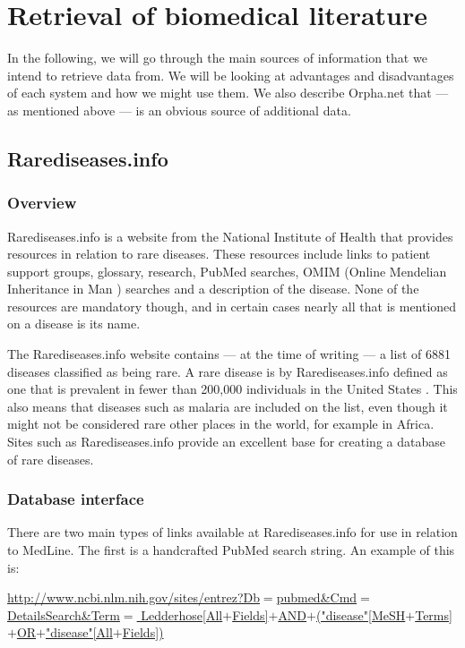 \section{Retrieval of biomedical literature}

In the following, we will go through the main sources of information
that we intend to retrieve data from. We will be looking at advantages
and disadvantages of each system and how we might use them. We also
describe Orpha.net that --- as mentioned above --- is an obvious source of
additional data.

\subsection{Rarediseases.info\label{Rarediseases_info}}

\subsubsection{Overview}
Rarediseases.info is a website from the National Institute of Health
\cite{NIHOverview} that provides resources in relation to rare
diseases. These resources include links to patient support groups,
glossary, research, PubMed searches, OMIM (Online Mendelian
Inheritance in Man \cite{OMIM}) searches and a description of the
disease. None of the resources are mandatory though, and in certain
cases nearly all that is mentioned on a disease is its name.

The Rarediseases.info website contains --- at the time of writing --- a list
of 6881 diseases classified as being rare. A rare disease is by
Rarediseases.info defined as one that is prevalent in fewer than
200,000 individuals in the United States \cite{RareDiseaseDef}. This
also means that diseases such as malaria are included on the list,
even though it might not be considered rare other places in the world,
for example in Africa. Sites such as Rarediseases.info provide an excellent
base for creating a database of rare diseases.

\subsubsection{Database interface}
There are two main types of links available at Rarediseases.info for
use in relation to MedLine. The first is a handcrafted PubMed search
string. An example of this is:

\noindent
{\small
\href{http://www.ncbi.nlm.nih.gov/sites/entrez?Db=pubmed&Cmd=DetailsSearch&Term=Ledderhose[All+Fields]+AND+("disease"[MeSH+Terms]+OR+"disease"[All+Fields])}{http://www.ncbi.nlm.nih.gov/sites/entrez?Db$=$pubmed\&Cmd$=$DetailsSearch\&Term$=$ Ledderhose[All$+$Fields]$+$AND$+$("disease"[MeSH$+$Terms]$+$OR$+$"disease"[All$+$Fields])} \\
}

